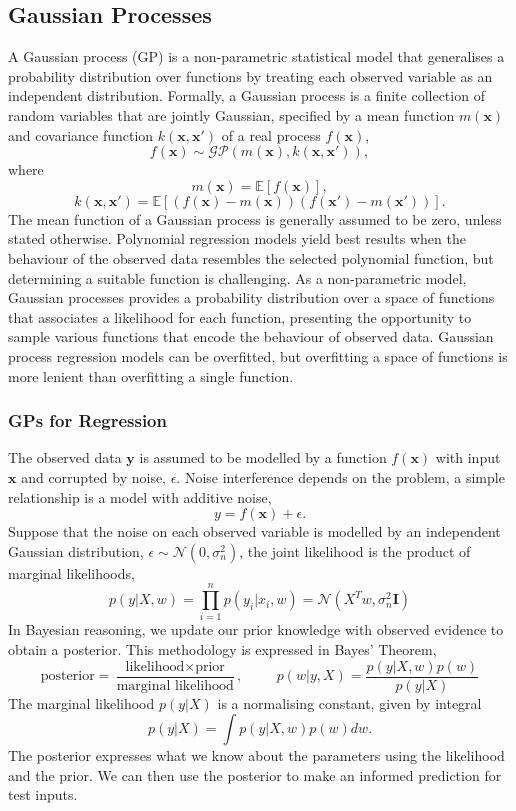 \documentclass[ %
author={Dillon Keith Diep},
supervisor={Dr. Carl Henrik Ek},
degree={MEng},
title={ART-CG:},
subtitle={Assisted Real-time Content Generation of 3D Hair by Learning Manifolds},
type={Research},
year={2017} ]{dissertation}
\begin{document}
\subsection{Gaussian Processes}
A Gaussian process (GP) is a non-parametric statistical model that generalises a probability distribution over functions by treating each observed variable as an independent distribution. Formally, a Gaussian process is a finite collection of random variables that are jointly Gaussian, specified by a mean function $m(\bm{x})$ and covariance function $k(\bm{x},\bm{x'})$ of a real process $f(\bm{x})$\cite[p.13]{gp},
$$f(\bm{x})\sim\mathcal{GP}(m(\bm{x}), k(\bm{x}, \bm{x'})),$$
where
$$m(\bm{x})=\mathbb{E}[f(\bm{x})],$$
$$k(\bm{x},\bm{x'})=\mathbb{E}[(f(\bm{x})-m(\bm{x}))(f(\bm{x'})-m(\bm{x'}))].$$
The mean function of a Gaussian process is generally assumed to be zero, unless stated otherwise.
Polynomial regression models yield best results when the behaviour of the observed data resembles the selected polynomial function, but determining a suitable function is challenging. As a non-parametric model, Gaussian processes provides a probability distribution over a space of functions that associates a likelihood for each function, presenting the opportunity to sample various functions that encode the behaviour of observed data. Gaussian process regression models can be overfitted, but overfitting a space of functions is more lenient than overfitting a single function.

\subsubsection{GPs for Regression}
The observed data $\bm{y}$ is assumed to be modelled by a function $f(\bm{x})$ with input $\bm{x}$ and corrupted by noise, $\epsilon$. Noise interference depends on the problem, a simple relationship is a model with additive noise,
$$y = f(\bm{x}) + \epsilon.$$
Suppose that the noise on each observed variable is modelled by an independent Gaussian distribution, $\epsilon\sim\mathcal{N}(0, \sigma^2_n)$, the joint likelihood is the product of marginal likelihoods,
$$p(y|X,w)=\prod^n_{i=1}p(y_i|x_i, w)=\mathcal{N}(X^Tw, \sigma^2_n\bm{I})$$
In Bayesian reasoning, we update our prior knowledge with observed evidence to obtain a posterior. This methodology is expressed in Bayes' Theorem,
\begin{equation} \label{bayes}
\text{posterior}=\frac{\text{likelihood}\times\text{prior}}{\text{marginal likelihood}}, \hspace{1cm} p(w|y,X)=\frac{p(y|X,w)p(w)}{p(y|X)}
\end{equation}
The marginal likelihood $p(y|X)$ is a normalising constant, given by integral
$$p(y|X)=\int p(y|X,w)p(w)dw.$$
The posterior expresses what we know about the parameters using the likelihood and the prior. We can then use the posterior to make an informed prediction for test inputs.
\end{document}
